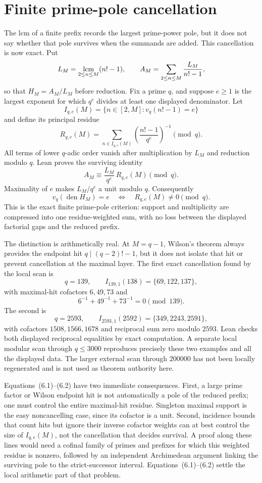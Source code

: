 \documentclass[11pt]{article}
\begin{document}
\section{Finite prime-pole cancellation}
\label{sec:prime-pole}

The lcm of a finite prefix records the largest prime-power pole, but it does
not say whether that pole survives when the summands are added.  This
cancellation is now exact.  Put
\[
 L_M=\mathop{\rm lcm}_{2\le n\le M}(n!-1),
 \qquad
 A_M=\sum_{2\le n\le M}\frac{L_M}{n!-1},
\]
so that $H_M=A_M/L_M$ before reduction.  Fix a prime $q$, and suppose $e\ge1$
is the largest exponent for which $q^e$ divides at least one displayed
denominator.  Let
\[
 I_{q,e}(M)=\{n\in[2,M]:v_q(n!-1)=e\}
\]
and define its principal residue
\[
 R_{q,e}(M)=
 \sum_{n\in I_{q,e}(M)}
 \left(\frac{n!-1}{q^e}\right)^{-1}\pmod q .
\]
All terms of lower $q$-adic order vanish after multiplication by $L_M$ and
reduction modulo $q$.  Lean proves the surviving identity
\[
 A_M\equiv \frac{L_M}{q^e}\,R_{q,e}(M)\pmod q.           \tag{6.1}
\]
Maximality of $e$ makes $L_M/q^e$ a unit modulo $q$.  Consequently
\[
 v_q\!\left(\operatorname{den}H_M\right)=e
 \quad\Longleftrightarrow\quad
 R_{q,e}(M)\ne0\pmod q.                                  \tag{6.2}
\]
This is the exact finite prime-pole criterion: support and multiplicity are
compressed into one residue-weighted sum, with no loss between the displayed
factorial gaps and the reduced prefix.

The distinction is arithmetically real.  At $M=q-1$, Wilson's theorem always
provides the endpoint hit $q\mid(q-2)!-1$, but it does not isolate that hit or
prevent cancellation at the maximal layer.  The first exact cancellation
found by the local scan is
\[
 q=139,\qquad I_{139,1}(138)=\{69,122,137\},
\]
with maximal-hit cofactors $6,49,73$ and
\[
 6^{-1}+49^{-1}+73^{-1}=0\pmod{139}.
\]
The second is
\[
 q=2593,\qquad I_{2593,1}(2592)=\{349,2243,2591\},
\]
with cofactors $1508,1566,1678$ and reciprocal sum zero modulo $2593$.
Lean checks both displayed reciprocal equalities by exact computation.  A
separate local modular scan through $q\le3000$ reproduces precisely these two
examples and all the displayed data.  The larger external scan through
$200000$ has not been locally regenerated and is not used as theorem
authority here.

Equations~(6.1)--(6.2) have two immediate consequences.  First, a large
prime factor or Wilson endpoint hit is not automatically a pole of the
reduced prefix; one must control the entire maximal-hit residue.  Singleton
maximal support is the easy noncancelling case, since its cofactor is a unit.
Second,
incidence bounds that count hits but ignore their inverse cofactor weights can
at best control the size of $I_{q,e}(M)$, not the cancellation that decides
survival.  A proof along these lines would need a cofinal family of primes and
prefixes for which this weighted residue is nonzero, followed by an
independent Archimedean argument linking the surviving pole to the
strict-successor interval.  Equations~(6.1)--(6.2) settle the local arithmetic
part of that problem.
\end{document}
